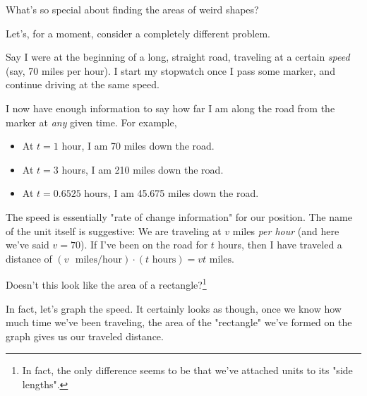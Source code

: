 \documentclass{article}
\begin{document}
What's so special about finding the areas of weird shapes?

Let's, for a moment, consider a completely different problem.

Say I were at the beginning of a long, straight road, traveling at a certain \emph{speed} (say, 70 miles per hour). I start my stopwatch once I pass some marker, and continue driving at the same speed.

I now have enough information to say how far I am along the road from the marker at \emph{any} given time. For example, 

\begin{itemize}
\item At $t = 1$ hour, I am 70 miles down the road.
\item At $t = 3$ hours, I am 210 miles down the road.
\item At $t = 0.6525$ hours, I am 45.675 miles down the road.
\end{itemize}

The speed is essentially "rate of change information" for our position. The name of the unit itself is suggestive: We are traveling at $v$ miles \emph{per hour} (and here we've said $v = 70$). If I've been on the road for $t$ hours, then I have traveled a distance of $(v \text{ }\text{miles}/\text{hour}) \cdot (t\text{ hours}) = vt\text{ miles}$.

Doesn't this look like the area of a rectangle?\footnote{In fact, the only difference seems to be that we've attached units to its "side lengths".}

In fact, let's graph the speed. It certainly looks as though, once we know how much time we've been traveling, the area of the "rectangle" we've formed on the graph gives us our traveled distance.







\end{document}
